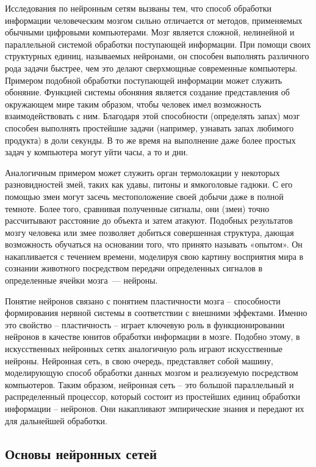 \documentclass[12pt, a4paper]{article}
\begin{document}
Исследования по нейронным сетям вызваны тем, что способ обработки информации человеческим мозгом сильно отличается от методов, применяемых обычными цифровыми компьютерами. Мозг является сложной, нелинейной и параллельной системой обработки поступающей информации. При помощи своих структурных единиц, называемых нейронами, он способен выполнять различного рода задачи быстрее, чем это делают сверхмощные современные компьютеры. Примером подобной обработки поступающей информации может служить обоняние. Функцией системы обоняния является создание представления об окружающем мире таким образом, чтобы человек имел возможность взаимодействовать с ним. Благодаря этой способности (определять запах) мозг способен выполнять простейшие задачи (например, узнавать запах любимого продукта) в доли секунды. В то же время на выполнение даже более простых задач у компьютера могут уйти часы, а то и дни.

Аналогичным примером может служить орган термолокации у некоторых разновидностей змей, таких как удавы, питоны и ямкоголовые гадюки. С его помощью змеи могут засечь местоположение своей добычи даже в полной темноте. Более того, сравнивая полученные сигналы, они (змеи) точно рассчитывают расстояние до объекта и затем атакуют.
Подобных результатов мозгу человека или змее позволяет добиться совершенная структура, дающая возможность обучаться на основании того, что принято называть «опытом». Он накапливается с течением времени, моделируя свою картину восприятия мира в сознании животного посредством передачи определенных сигналов в определенные ячейки мозга~--- нейроны.

Понятие нейронов связано с понятием пластичности мозга – способности формирования нервной системы в соответствии с внешними эффектами. Именно это свойство – пластичность – играет ключевую роль в функционировании нейронов в качестве юнитов обработки информации в мозге. Подобно этому, в искусственных нейронных сетях аналогичную роль играют искусственные нейроны. Нейронная сеть, в свою очередь, представляет собой машину, моделирующую способ обработки данных мозгом и реализуемую
посредством компьютеров.  Таким образом, нейронная сеть – это большой параллельный и распределенный процессор, который состоит из простейших единиц обработки информации – нейронов. Они накапливают эмпирические знания и передают их для дальнейшей обработки.

\subsection{Основы нейронных сетей}
\end{document}
